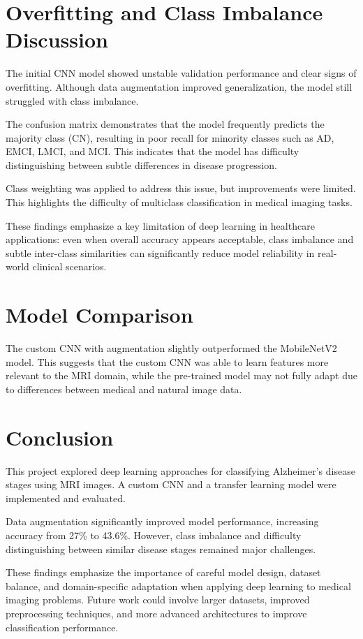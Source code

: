 \documentclass[12pt]{article}
\begin{document}
\section{Overfitting and Class Imbalance Discussion}

The initial CNN model showed unstable validation performance and clear signs of overfitting. Although data augmentation improved generalization, the model still struggled with class imbalance.

The confusion matrix demonstrates that the model frequently predicts the majority class (CN), resulting in poor recall for minority classes such as AD, EMCI, LMCI, and MCI. This indicates that the model has difficulty distinguishing between subtle differences in disease progression.

Class weighting was applied to address this issue, but improvements were limited. This highlights the difficulty of multiclass classification in medical imaging tasks.

These findings emphasize a key limitation of deep learning in healthcare applications: even when overall accuracy appears acceptable, class imbalance and subtle inter-class similarities can significantly reduce model reliability in real-world clinical scenarios.

\section{Model Comparison}

The custom CNN with augmentation slightly outperformed the MobileNetV2 model. This suggests that the custom CNN was able to learn features more relevant to the MRI domain, while the pre-trained model may not fully adapt due to differences between medical and natural image data.

\section{Conclusion}

This project explored deep learning approaches for classifying Alzheimer’s disease stages using MRI images. A custom CNN and a transfer learning model were implemented and evaluated.

Data augmentation significantly improved model performance, increasing accuracy from 27\% to 43.6\%. However, class imbalance and difficulty distinguishing between similar disease stages remained major challenges.

These findings emphasize the importance of careful model design, dataset balance, and domain-specific adaptation when applying deep learning to medical imaging problems. Future work could involve larger datasets, improved preprocessing techniques, and more advanced architectures to improve classification performance.
\end{document}
